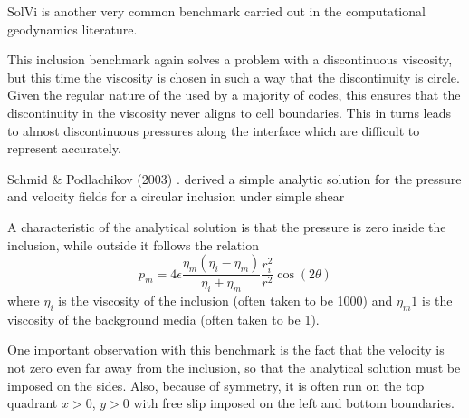 SolVi is another very common benchmark carried out in the computational 
geodynamics literature.

This inclusion benchmark again solves a problem with a discontinuous viscosity, 
but this time the viscosity is chosen in such a way that the discontinuity is circle. 
Given the regular nature of the used by a majority of codes, 
this ensures that the discontinuity in the viscosity never aligns to cell boundaries.
This in turns leads to almost discontinuous pressures along the interface which are difficult 
to represent accurately.

Schmid \& Podlachikov (2003) \cite{scpo03}. 
derived a simple analytic solution for the pressure and velocity fields for a circular 
inclusion under simple shear 

A characteristic of the analytical solution is that the pressure is zero 
inside the inclusion, while outside it follows the relation
\[
p_m = 4 \dot{\epsilon}
\frac{\eta_m(\eta_i-\eta_m)}{\eta_i+\eta_m}
\frac{r_i^2}{r^2} \cos(2\theta)
\]
where $\eta_i$ is the viscosity of the inclusion (often taken to be 1000)
and $\eta_m1$ is the viscosity of the background media (often taken to be 1). 

One important observation with this benchmark is the fact that the velocity is not zero even far 
away from the inclusion, so that the analytical solution must be imposed on the sides.
Also, because of symmetry, it is often run on the top quadrant $x>0$, $y>0$ with 
free slip imposed on the left and bottom boundaries. 

